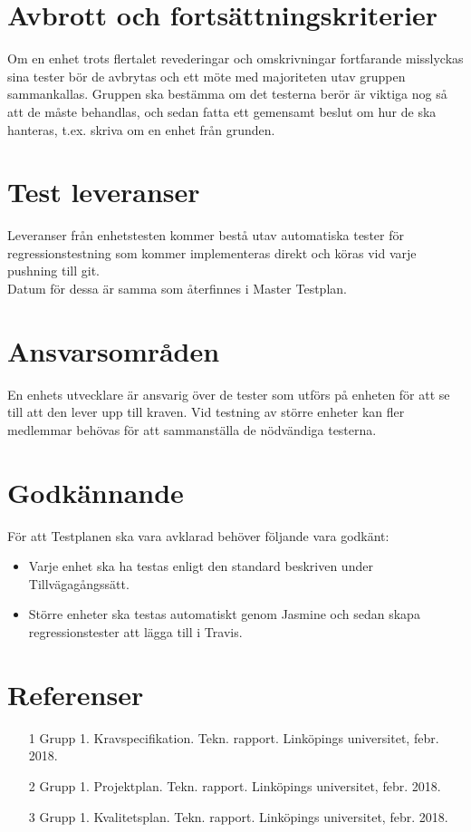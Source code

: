 \documentclass[10pt]{article}
\begin{document}
\section{Avbrott och fortsättningskriterier}
	Om en enhet trots flertalet revederingar och omskrivningar fortfarande misslyckas sina tester bör de avbrytas och ett möte med majoriteten utav gruppen sammankallas. 
	Gruppen ska bestämma om det testerna berör är viktiga nog så att de måste behandlas, och sedan fatta ett gemensamt beslut om hur de ska hanteras, t.ex. skriva om en enhet från grunden.


\section{Test leveranser}

Leveranser från enhetstesten kommer bestå utav automatiska tester för regressionstestning som kommer implementeras direkt och köras vid varje pushning till git. 
\\
Datum för dessa är samma som återfinnes i Master Testplan.



\section{Ansvarsområden}
	En enhets utvecklare är ansvarig över de tester som utförs på enheten för att se till att den lever upp till kraven. Vid testning av större enheter kan fler medlemmar behövas för att sammanställa de nödvändiga testerna.
	
	
	
\section{Godkännande}
	För att Testplanen ska vara avklarad behöver följande vara godkänt:
	\begin{itemize}
	 \item Varje enhet ska ha testas enligt den standard beskriven under Tillvägagångssätt.
	 \item Större enheter ska testas automatiskt genom {\color{red}Jasmine} och sedan skapa regressionstester att lägga till i Travis.
	\end{itemize}
	


\section{Referenser}
	\begin{itemize}
	\item [1] Grupp 1. Kravspecifikation. Tekn. rapport. Linköpings universitet, febr. 2018.
	\item [2] Grupp 1. Projektplan. Tekn. rapport. Linköpings universitet, febr. 2018.
	\item [3] Grupp 1. Kvalitetsplan. Tekn. rapport. Linköpings universitet, febr. 2018.
	\end{itemize}
	
\end{document}
